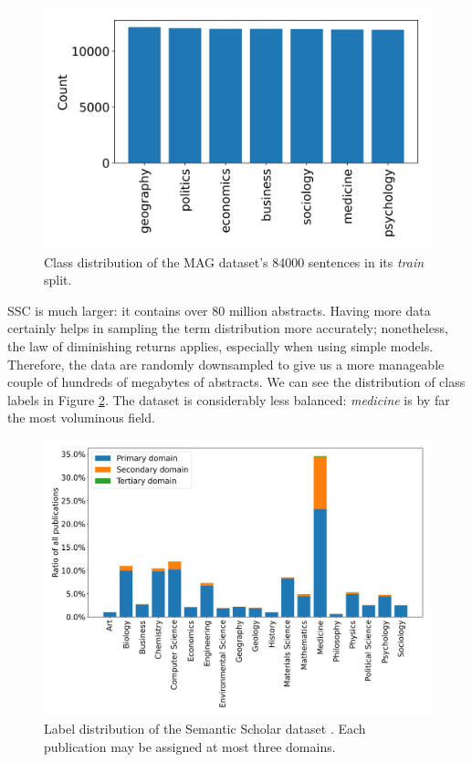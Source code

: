 \begin{figure}
    \centering
    \includegraphics[width=0.5\linewidth]{figures/mag-distribution.png}
    \captionsetup{width=.9\linewidth}
    \caption{Class distribution of the MAG  \cite{wang2019review} dataset's 84000 sentences in its \textit{train} split.}
    \label{fig:mag-distribtion}
\end{figure}

SSC is much larger: it contains over 80 million abstracts. Having more data certainly helps in sampling the term distribution more accurately; nonetheless, the law of diminishing returns applies, especially when using simple models. Therefore, the data are randomly downsampled to give us a more manageable couple of hundreds of megabytes of abstracts. We can see the distribution of class labels in Figure \ref{fig:ss-distribution}. The dataset is considerably less balanced: \textit{medicine} is by far the most voluminous field.

\begin{figure}
    \centering
    \includegraphics[width=0.85\linewidth]{figures/ss-distribution.png}
    \captionsetup{width=.9\linewidth}
    \caption{Label distribution of the Semantic Scholar dataset \cite{Lo2020S2ORCTS}. Each publication may be assigned at most three domains.}
    \label{fig:ss-distribution}
\end{figure}


